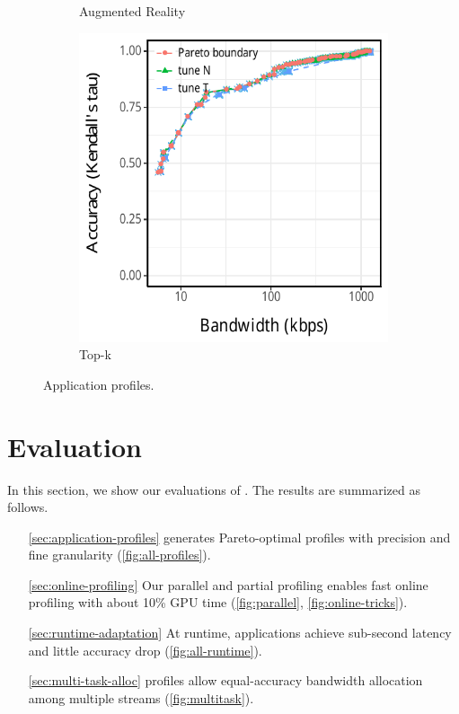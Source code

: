 \begin{figure}[htb]
\begin{subfigure}[t]{0.33\textwidth}
    \caption{Augmented Reality}
    \label{fig:ar-profile}
  \end{subfigure}
  \hfill
  \begin{subfigure}[t]{0.33\textwidth}
    \centering
    \includegraphics[width=\textwidth]{figures/profile-topk.pdf}
    \caption{Top-k}
    \label{fig:tk-profile}
  \end{subfigure}
  \caption{Application profiles.}
  \label{fig:all-profiles}
\end{figure}

\newpage

\section{Evaluation}
\label{sec:evaluation}

In this section, we show our evaluations of \sysname{}. The results are
summarized as follows.

\begin{itemize}
\item[\autoref{sec:application-profiles}] \sysname{} generates Pareto-optimal
  profiles with precision and fine granularity (\autoref{fig:all-profiles}).
\item[\autoref{sec:online-profiling}] Our parallel and partial profiling enables
  fast online profiling with about 10\% GPU time (\autoref{fig:parallel},
  \autoref{fig:online-tricks}).
\item[\autoref{sec:runtime-adaptation}] At runtime, \sysname{} applications
  achieve sub-second latency and little accuracy drop
  (\autoref{fig:all-runtime}).
\item[\autoref{sec:multi-task-alloc}] \sysname{} profiles allow equal-accuracy
  bandwidth allocation among multiple streams (\autoref{fig:multitask}).
\end{itemize}

